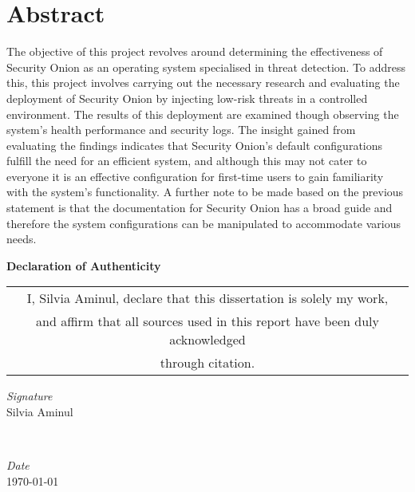 \documentclass[12pt]{article}
\begin{document}
	\section{Abstract}
	The objective of this project revolves around determining the effectiveness of Security Onion as an operating system specialised in threat detection. To address this, this project involves carrying out the necessary research and evaluating the deployment of Security Onion by injecting low-risk threats in a controlled environment. The results of this deployment are examined though observing the system's health performance and security logs. The insight gained from evaluating the findings indicates that Security Onion's default configurations fulfill the need for an efficient system, and although this may not cater to everyone it is an effective configuration for first-time users to gain familiarity with the system's functionality. A further note to be made based on the previous statement is that the documentation for Security Onion has a broad guide and therefore the system configurations can be manipulated to accommodate various needs.
	\newpage
	
	\tableofcontents
	\newpage
	
	
	
	
	\begin{center}
		
		
		\vspace*{\fill}
		
		\textbf{Declaration of Authenticity}
		\vspace{1cm} %
		
		\begin{tabular}{c}
			I, Silvia Aminul, declare that this dissertation is solely my work, \\
			and affirm that all sources used in this report have been duly acknowledged \\
			through citation.
		\end{tabular}
		
		\vspace{2cm} %
		
		\begin{minipage}{0.4\textwidth}
			
			\begin{flushleft}
				\large
				\textit{Signature}\\
				Silvia Aminul 
			\end{flushleft}
		\end{minipage}
		~
		\begin{minipage}{0.4\textwidth}
			\begin{flushright}
				\large
				\textit{Date}\\
				{\today}
			\end{flushright}
			
			
		\end{minipage}
		
		\vspace*{\fill}
	\end{center}
	
\end{document}
